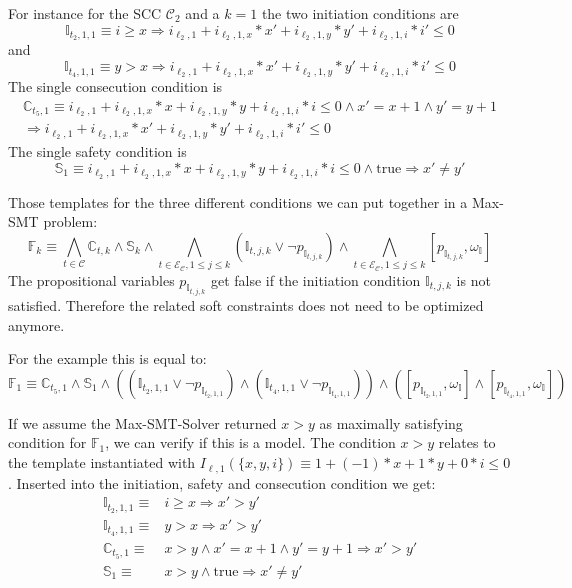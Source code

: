 For instance for the SCC $\mathcal{C}_2$ and a $k=1$ the two initiation conditions are \[ \mathbb{I}_{t_2, 1, 1} \equiv i \geq x \Rightarrow i_{\ell_2,1} + i_{\ell_2,1,x} * x' + i_{\ell_2,1,y} * y' + i_{\ell_2,1,i} * i' \leq 0 \] and \[ \mathbb{I}_{t_4, 1, 1} \equiv y > x \Rightarrow i_{\ell_2,1} + i_{\ell_2,1,x} * x' + i_{\ell_2,1,y} * y' + i_{\ell_2,1,i} * i' \leq 0 \]
The single consecution condition is
\begin{multline}
  \mathbb{C}_{t_5, 1} \equiv i_{\ell_2,1} + i_{\ell_2,1,x} * x + i_{\ell_2,1,y} * y + i_{\ell_2,1,i} * i \leq 0 \wedge x' = x + 1 \wedge y' = y + 1 \\
  \Rightarrow i_{\ell_2,1} + i_{\ell_2,1,x} * x' + i_{\ell_2,1,y} * y' + i_{\ell_2,1,i} * i' \leq 0
\end{multline}
The single safety condition is
\[ \mathbb{S}_1 \equiv i_{\ell_2,1} + i_{\ell_2,1,x} * x + i_{\ell_2,1,y} * y + i_{\ell_2,1,i} * i \leq 0 \wedge \text{true} \Rightarrow x' \neq y' \]
  
Those templates for the three different conditions we can put together in a Max-SMT problem:
\[ \mathbb{F}_k \equiv \bigwedge_{t \in \mathcal{C}} \mathbb{C}_{t, k} \wedge \mathbb{S}_k \wedge \bigwedge_{t \in \mathcal{E}_\mathcal{C}, 1 \leq j \leq k}{(\mathbb{I}_{t,j,k} \vee \neg p_{\mathbb{I}_{t,j,k}})} \wedge \bigwedge_{t \in \mathcal{E}_\mathcal{C}, 1 \leq j \leq k}{[p_{\mathbb{I}_{t,j,k}}, \omega_\mathbb{I}]} \]
The propositional variables $p_{\mathbb{I}_{t,j,k}}$ get false if the initiation condition $\mathbb{I}_{t,j,k}$ is not satisfied.
Therefore the related soft constraints does not need to be optimized anymore.

For the example this is equal to:
\[ \mathbb{F}_1 \equiv \mathbb{C}_{t_5, 1} \wedge \mathbb{S}_1 \wedge ((\mathbb{I}_{t_2,1,1} \vee \neg p_{\mathbb{I}_{t_2,1,1}}) \wedge (\mathbb{I}_{t_4,1,1} \vee \neg p_{\mathbb{I}_{t_4,1,1}})) \wedge ([p_{\mathbb{I}_{t_2,1,1}}, \omega_\mathbb{I}] \wedge [p_{\mathbb{I}_{t_4,1,1}}, \omega_\mathbb{I}]) \]

If we assume the Max-SMT-Solver returned $x > y$ as maximally satisfying condition for $\mathbb{F}_1$, we can verify if this is a model.
The condition $x > y$ relates to the template instantiated with $I_{\ell,1}(\lbrace x, y, i \rbrace) \equiv 1 + (-1) * x + 1 * y + 0 * i \leq 0$.
Inserted into the initiation, safety and consecution condition we get:
\begin{align}
  \mathbb{I}_{t_2, 1, 1} \equiv & i \geq x \Rightarrow x' > y'\\
  \mathbb{I}_{t_4, 1, 1} \equiv & y > x \Rightarrow x' > y'\\
  \mathbb{C}_{t_5, 1} \equiv & x > y \wedge x' = x + 1 \wedge y' = y + 1 \Rightarrow x' > y'\\
  \mathbb{S}_1 \equiv & x > y \wedge \text{true} \Rightarrow x' \neq y'
\end{align}


